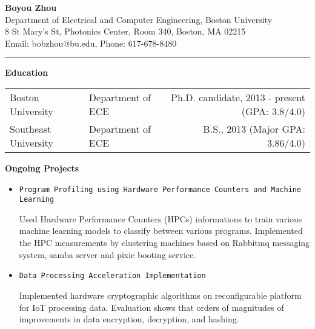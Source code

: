 \documentclass[]{article}
\begin{document}
\pagestyle{empty}
\begin{center}
{\large\textbf{Boyou Zhou}}\\
Department of Electrical and Computer Engineering, Boston University\\
8 St Mary's St, Photonics Center, Room 340, Boston, MA 02215\\
Email: bobzhou@bu.edu, Phone: 617-678-8480\\
\rule[-0.1cm]{7.5in}{0.01cm}
\end{center}
%

\textbf{Education}
\begin{table*}[h]
  \begin{tabular}{p{2.0in}p{2.0in}r}
    Boston University& Department of ECE & Ph.D. candidate, 2013 - present
    (GPA: 3.8/4.0)\\ 
    Southeast University & Department of ECE & B.S., 2013
    (Major GPA: 3.86/4.0)\\ 
  \end{tabular}
  \label{tbl:1}
\end{table*}

\noindent \textbf{Ongoing Projects}
\begin{itemize}


		\item \verb+Program Profiling using Hardware Performance Counters and Machine Learning+
		
		Used Hardware Performance Counters (HPCs) informations to train various
machine learning models to classify between various programs. Implemented the HPC
measurements by clustering machines based on Rabbitmq messaging system, samba
server and pixie booting service.

		\item \verb+Data Processing Acceleration Implementation+

		Implemented hardware cryptographic algorithms on reconfigurable
platform for IoT processing data. Evaluation shows that orders of magnitudes of
improvements in data encryption, decryption, and hashing.
\end{itemize}
\end{document}
